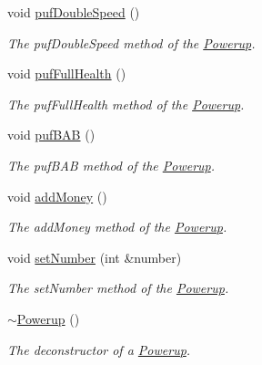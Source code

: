 \begin{DoxyCompactItemize}
void \hyperlink{class_powerup_ac009392b9c8baacde7677547fe599fb6}{puf\+Double\+Speed} ()
\begin{DoxyCompactList}\small\item\em The puf\+Double\+Speed method of the \hyperlink{class_powerup}{Powerup}. \end{DoxyCompactList}\item 
void \hyperlink{class_powerup_af40ff299d75a5602af3694f3e96858b0}{puf\+Full\+Health} ()
\begin{DoxyCompactList}\small\item\em The puf\+Full\+Health method of the \hyperlink{class_powerup}{Powerup}. \end{DoxyCompactList}\item 
void \hyperlink{class_powerup_a460b51e075104b753a01cc8f65f6d36e}{puf\+B\+A\+B} ()
\begin{DoxyCompactList}\small\item\em The puf\+B\+A\+B method of the \hyperlink{class_powerup}{Powerup}. \end{DoxyCompactList}\item 
void \hyperlink{class_powerup_ad94eaace43d88c536f3c7fcae4d3628a}{add\+Money} ()
\begin{DoxyCompactList}\small\item\em The add\+Money method of the \hyperlink{class_powerup}{Powerup}. \end{DoxyCompactList}\item 
void \hyperlink{class_powerup_a4210c58662eb9b035e5ec539fe9b76d2}{set\+Number} (int \&number)
\begin{DoxyCompactList}\small\item\em The set\+Number method of the \hyperlink{class_powerup}{Powerup}. \end{DoxyCompactList}\item 
\hypertarget{class_powerup_a2e1c97859d671527885e6f4eb200ca3f}{\hyperlink{class_powerup_a2e1c97859d671527885e6f4eb200ca3f}{$\sim$\+Powerup} ()}\label{class_powerup_a2e1c97859d671527885e6f4eb200ca3f}

\begin{DoxyCompactList}\small\item\em The deconstructor of a \hyperlink{class_powerup}{Powerup}. \end{DoxyCompactList}\end{DoxyCompactItemize}

